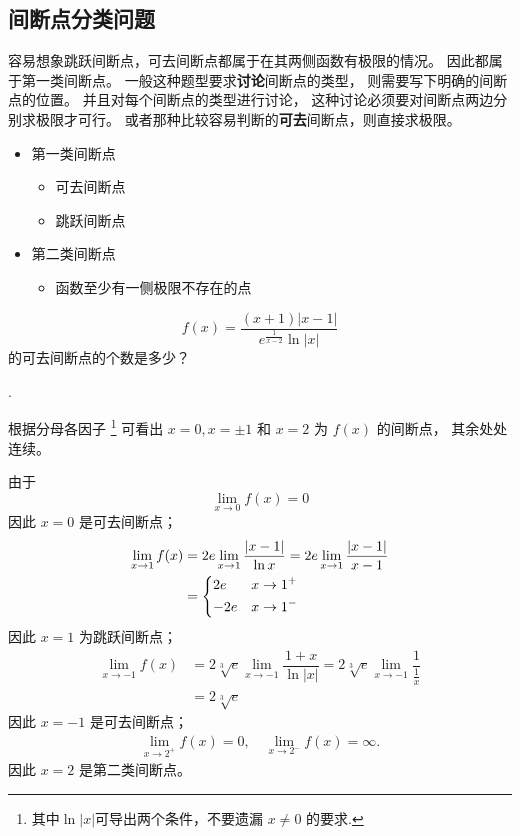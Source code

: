 \subsection{间断点分类问题}
\label{function-discontinunities-classfication-questions}

容易想象跳跃间断点，可去间断点都属于在其两侧函数有极限的情况。
因此都属于第一类间断点。
一般这种题型要求\textbf{讨论}间断点的类型，
则需要写下明确的间断点的位置。 并且对每个间断点的类型进行讨论，
这种讨论必须要对间断点两边分别求极限才可行。
或者那种比较容易判断的\textbf{可去}间断点，则直接求极限。

\begin{itemize}
    \item 第一类间断点
        \begin{itemize} 
            \item 可去间断点
            \item 跳跃间断点
        \end{itemize}
    \item 第二类间断点
        \begin{itemize}
            \item 函数至少有一侧极限不存在的点
        \end{itemize}
\end{itemize}

\begin{example}
    \[
        f(x) = \dfrac{(x+1) | x-1 |}{e^{\frac{1}{x-2}} \ln |x|}
    \]
    的可去间断点的个数是多少？

    \cite[page 46, pdf 57, example 4]{we}.

    根据分母各因子
    \footnote{其中$\ln |x|$可导出两个条件，不要遗漏 $x \neq 0$ 的要求.}
    可看出 $x = 0, x = \pm 1$ 和 $x = 2$ 为 $f(x)$ 的间断点，
    其余处处连续。

    由于
    \[
        \lim_{x \to 0} f(x) = 0
    \]
    因此 $x = 0$ 是可去间断点；
    \begin{align*}
        \lim_{x \to 1} f(x) &= 2e \lim_{x\to 1} \dfrac{|x - 1|}{\ln x} = 2e \lim_{x\to 1} \dfrac{|x - 1|}{x - 1} \\
                            &= 
                            \begin{dcases}
                                2e & x \to 1^+ \\
                                -2e & x \to 1^-
                            \end{dcases}
    \end{align*}
    因此 $x = 1$ 为跳跃间断点；
    \begin{align*}
        \lim_{x \to -1} f(x) &= 2 \sqrt[3]{e} \lim_{x \to -1} \dfrac{1 + x}{\ln |x|} = 2 \sqrt[3]{e} \lim_{x \to -1} \dfrac{1}{\frac{1}{x}} \\
                             &= 2 \sqrt[3]{e}
    \end{align*}
    因此 $x = -1$ 是可去间断点；
    \begin{align*}
        \lim_{x \to 2^+} f(x) = 0, \quad \lim_{x \to 2^-} f(x) = \infty.
    \end{align*}
    因此 $x = 2$ 是第二类间断点。
\end{example}

